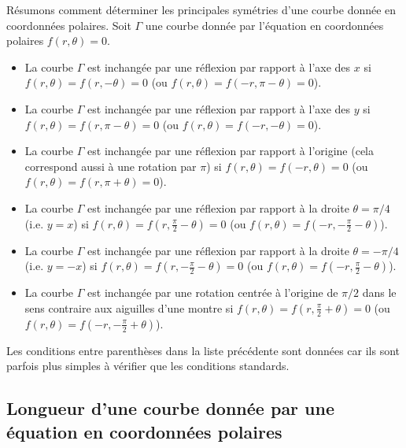 {\begin{rmk}
Résumons comment déterminer les principales symétries d'une courbe
donnée en coordonnées polaires.  Soit $\Gamma$ une courbe donnée par
l'équation en coordonnées polaires $f(r,\theta)=0$.

\begin{itemize}
\item La courbe $\Gamma$ est inchangée par une réflexion par rapport à
l'axe des $x$ si $f(r,\theta) = f(r,-\theta) = 0$ (ou
$f(r,\theta) = f(-r,\pi-\theta) = 0$). 
\item La courbe $\Gamma$ est inchangée par une réflexion par rapport à
l'axe des $y$ si $f(r,\theta) = f(r,\pi-\theta) = 0$ (ou
$f(r,\theta) = f(-r,-\theta) = 0$).
\item La courbe $\Gamma$ est inchangée par une réflexion par rapport à
l'origine (cela correspond aussi à une rotation par $\pi$) si 
$f(r,\theta) = f(-r,\theta) = 0$ (ou $f(r,\theta) = f(r,\pi+\theta) = 0$).
\item La courbe $\Gamma$ est inchangée par une réflexion par rapport à
la droite $\theta = \pi/4$ (i.e. $y=x$) si
$\displaystyle f(r,\theta) = f\left(r,\frac{\pi}{2} -\theta\right) = 0$ (ou
$\displaystyle f(r,\theta) = f\left(-r,-\frac{\pi}{2}-\theta\right)$).
\item La courbe $\Gamma$ est inchangée par une réflexion par rapport à
la droite $\theta = -\pi/4$ (i.e. $y=-x$) si 
$\displaystyle f(r,\theta) = f\left(r,-\frac{\pi}{2} -\theta\right) = 0$
(ou
$\displaystyle f(r,\theta) = f\left(-r,\frac{\pi}{2}-\theta\right)$).
\item La courbe $\Gamma$ est inchangée par une rotation centrée à
l'origine de $\pi/2$ dans le sens contraire aux aiguilles d'une montre
si
$\displaystyle f(r,\theta) = f\left(r,\frac{\pi}{2}+\theta\right) = 0$
(ou
$\displaystyle f(r,\theta) = f\left(-r,-\frac{\pi}{2}+\theta\right)$).
\end{itemize}

Les conditions entre parenthèses dans la liste précédente sont données
car ils sont parfois plus simples à vérifier que les conditions
standards.
\end{rmk}

\subsection[Longueur d'une courbe]{Longueur d'une courbe donnée par
  une équation en coordonnées polaires}

}
